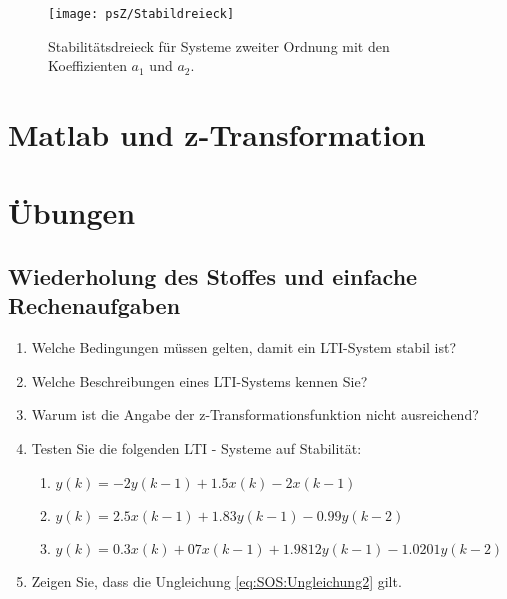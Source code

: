 \begin{figure}[H]
\begin{center}
\texttt{[image: psZ/Stabildreieck]}
\caption{\label{pic:Stabilddreieck}Stabilitätsdreieck für Systeme zweiter Ordnung mit
den Koeffizienten $a_1$ und $a_2$.}
\end{center}
\end{figure}
{
\section{Matlab und z-Transformation}

}

\section{Übungen}
\subsection{Wiederholung des Stoffes und einfache Rechenaufgaben}
\begin{enumerate}
    \item Welche Bedingungen müssen gelten, damit ein LTI-System stabil ist?
    \item Welche Beschreibungen eines LTI-Systems kennen Sie?
    \item Warum ist die Angabe der z-Transformationsfunktion nicht ausreichend?
    \item \label{Aufg:zTrafo:Stabilitaet}Testen Sie die folgenden LTI - Systeme auf Stabilität:
    \begin{enumerate}
        \item $y(k) = -2 y(k-1) + 1.5 x(k) - 2x(k-1)$
        \item $y(k) =  2.5 x(k-1) + 1.83 y(k-1)  - 0.99y(k-2)$
        \item $y(k) =  0.3 x(k) + 07 x(k-1) + 1.9812 y(k-1)   - 1.0201 y(k-2)$
    \end{enumerate}
    \item{Zeigen Sie, dass die Ungleichung \ref{eq:SOS:Ungleichung2} gilt.}
\end{enumerate}
